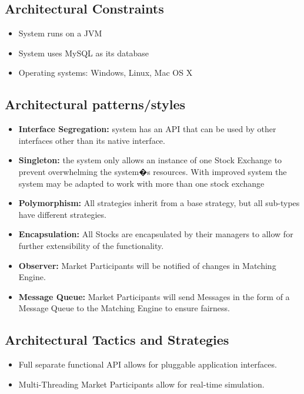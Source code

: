 \documentclass[12pt]{article}
\begin{document}
                            \subsection{Architectural Constraints}	
                                    \begin{itemize}
                                            \item System runs on a JVM
                                            \item System uses MySQL as its database
                                            \item Operating systems: Windows, Linux, Mac OS X
                                    \end{itemize}						    	    
		\subsection{Architectural patterns/styles}
                                \begin{itemize}
                                    \item \textbf{Interface Segregation:} system has an API that can be used by other interfaces other than its native interface.
                                    \item \textbf{Singleton:} the system only allows an instance of one Stock Exchange to prevent overwhelming the system�s resources. With improved system the system may be adapted to work with more than one stock exchange
                                    \item \textbf{Polymorphism:} All strategies inherit from a base strategy, but all sub-types have different strategies.
                                    \item \textbf{Encapsulation:} All Stocks are encapsulated by their managers to allow for further extensibility of the functionality.
                                    \item \textbf{Observer:} Market Participants will be notified of changes in Matching Engine. 
                                    \item \textbf{Message Queue:} Market Participants will send Messages in the form of a Message Queue to the Matching Engine to ensure fairness.
                                \end{itemize}
                \subsection{Architectural Tactics and Strategies} 
                    \begin{itemize}
                        \item Full separate functional API allows for pluggable application interfaces.
                        \item Multi-Threading Market Participants allow for real-time simulation.
                    \end{itemize}
\end{document}
